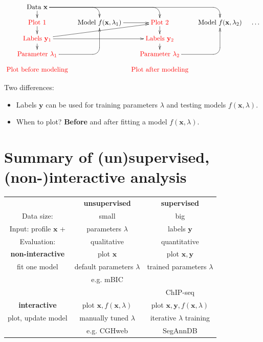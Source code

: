 \documentclass[a4paper,10pt]{article} %
\begin{document}
\begin{displaymath}
  \xymatrix@=0.3cm{
    \text{Data $\mathbf x$}
    \ar `[r] [dr] 
    \ar `r[rr] [drr] 
    \ar `r[rrr] [drrr] 
    \ar [d]
    & \text{ }
    & \text{ }
    & \text{ }
    \\
    \textcolor{red}{\text{Plot 1} }
    \ar [d]
    & 
    \text{Model $f(\mathbf x, \lambda_1)$} 
    \ar [r]
    &
    \textcolor{red}{\text{Plot 2} }
    \ar [d]
    & 
    \text{Model $f(\mathbf x, \lambda_2)$}  & \dots
    \\
    \textcolor{red}{\text{Labels $\mathbf y_1$}       }
    \ar [d]
    \ar [rr]
    \ar [rru]
    &
    &
    \textcolor{red}{\text{Labels $\mathbf y_2$}}
    \ar [d]
    \\
    \textcolor{red}{\text{Parameter $\lambda_1$} }
    \ar `r[ruu] [ruu]
    & \text{ }
    & \textcolor{red}{\text{Parameter $\lambda_2$}}
    \ar `r[ruu] [ruu] \\
    \textcolor{red}{\text{Plot before modeling}} &
    &
    \textcolor{red}{\text{Plot after modeling}} 
  }
\end{displaymath}

Two differences:
\begin{itemize}
\item Labels $\mathbf y$ can be used for training parameters $\lambda$
  and testing models $f(\mathbf x, \lambda)$.
\item When to plot? \textbf{Before} and after fitting a model
  $f(\mathbf x, \lambda)$.
\end{itemize}

\section*{Summary of (un)supervised, (non-)interactive analysis}

  \begin{center}
  \begin{tabular}{c|c|c}
    & \textbf{unsupervised} & \textbf{supervised}\\
    Data size: & small & big\\
    Input: profile $\mathbf x$ + & parameters $\lambda$ & labels $\mathbf y$ \\
    Evaluation: & qualitative &  quantitative \\
    \hline
    \textbf{non-interactive}
    & plot $\mathbf x$ & plot $\mathbf x, \mathbf y$\\
    fit one model
    & default parameters $\lambda$ & trained parameters $\lambda$ \\
    & e.g. mBIC \citep{mBIC} & \citep{HOCKING-penalties, HOCKING-breakpoints}\\
    && ChIP-seq \citep{hocking2014visual}\\
    \hline
    \textbf{interactive}
    & plot $\mathbf x, f(\mathbf x, \lambda)$ 
    & plot $\mathbf x, \mathbf y, f(\mathbf x, \lambda)$\\
    plot, update model 
    & manually tuned $\lambda$ & iterative $\lambda$ training\\
    & e.g. CGHweb \citep{CGHweb}  & SegAnnDB \citet{HOCKING-SegAnnDB}
  \end{tabular}
  \end{center}



\end{document}

